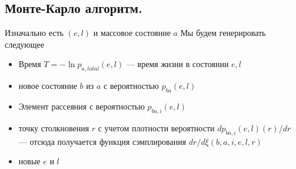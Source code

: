 \subsection{Монте-Карло алгоритм.}
Изначально есть $(e,l)$ и массовое состояние $a$
Мы будем генерировать следующее
\begin{itemize}
	\item Время $T = -\ln{p_{a, total}(e,l)}$ --- время жизни в состоянии $e,l$
	\item новое состояние $b$ из $a$ с вероятностью $p_{ba}(e,l)$
	\item Элемент рассеяния с вероятностью $p_{ba, i}(e,l)$
	\item точку столкновения $r$ с учетом плотности вероятности $dp_{ba,i}(e,l)(r)/dr$ --- отсюда получается функция сэмплирования $dr/d\xi(b,a,i, e,l,r)$
	\item новые $e$ и $l$
	
\end{itemize}




